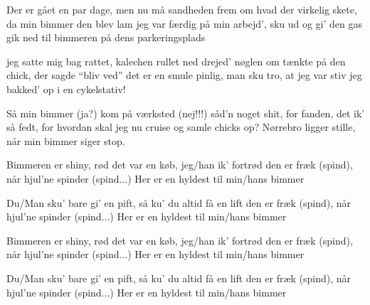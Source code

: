 \documentclass[a4paper,11pt]{article}
\begin{document}
\begin{song}
 Der er gået en par dage, men nu må sandheden frem
om hvad der virkelig skete, da min bimmer den blev lam
jeg var færdig på min arbejd', sku ud og gi' den gas
gik ned til bimmeren på dens parkeringsplads

 jeg satte mig bag rattet, kalechen rullet ned
drejed' nøglen om tænkte på den chick, der sagde ``bliv ved''
det er en smule pinlig, man sku tro, at jeg var stiv
jeg bakked' op i en cykelstativ!

 Så min bimmer (ja?)
kom på værksted (nej!!!)
såd'n noget shit, for fanden, det ik' så fedt,
for hvordan skal jeg nu cruise og samle chicks op?
Nørrebro ligger stille, når min bimmer siger stop.

 Bimmeren er shiny, rød
det var en køb, jeg/han ik' fortrød
den er fræk (spind), når hjul'ne spinder (spind...)
Her er en hyldest til min/hans bimmer

 Du/Man sku' bare gi' en pift,
så ku' du altid få en lift
den er fræk (spind), når hjul'ne spinder (spind...)
Her er en hyldest til min/hans bimmer

 Bimmeren er shiny, rød
det var en køb, jeg/han ik' fortrød
den er fræk (spind), når hjul'ne spinder (spind...)
Her er en hyldest til min/hans bimmer

 Du/Man sku' bare gi' en pift,
så ku' du altid få en lift
den er fræk (spind), når hjul'ne spinder (spind...)
Her er en hyldest til min/hans bimmer
\end{song}
\end{document}
